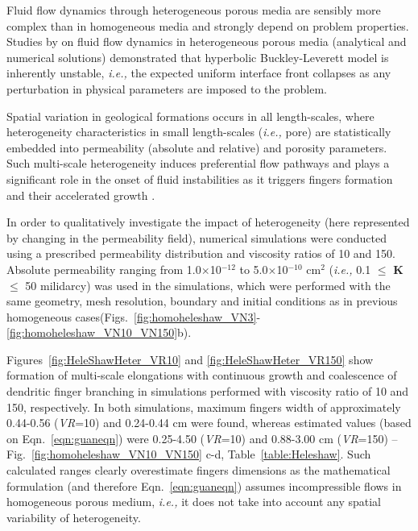 \documentclass[preprint,authoryear,12pt]{elsarticle}
\newcommand{\ie}{{\it i.e., }}
\begin{document}
\medskip
Fluid flow dynamics through heterogeneous porous media are sensibly more complex than in homogeneous media and strongly depend on problem properties. Studies by \citet{langtangen_1992} on fluid flow dynamics in heterogeneous porous media (analytical and numerical solutions) demonstrated that hyperbolic Buckley-Leverett model is inherently unstable, \ie the expected uniform interface front collapses as any perturbation in physical parameters are imposed to the problem. 

Spatial variation in geological formations occurs in all length-scales, where heterogeneity characteristics in small length-scales (\ie pore) are statistically embedded into permeability (absolute and relative) and porosity parameters. Such multi-scale heterogeneity induces preferential flow pathways and plays a significant role in the onset of fluid instabilities as it triggers fingers formation and their accelerated growth \citep[see][]{ewing_1989,tchelepi_1994}.

\medskip
In order to qualitatively investigate the impact of heterogeneity (here represented by changing in the permeability field), numerical simulations were conducted using a prescribed permeability distribution and viscosity ratios of 10 and 150. Absolute permeability ranging from 1.0$\times$10$^{-12}$ to 5.0$\times$10$^{-10}$ cm$^{2}$ (\ie 0.1 $\le$ {\bf K} $\le$ 50 milidarcy) was used in the simulations, which were performed with the same geometry,  mesh resolution, boundary and initial conditions as in previous homogeneous cases(Figs.~\ref{fig:homoheleshaw_VN3}-\ref{fig:homoheleshaw_VN10_VN150}b). 

\medskip
Figures~\ref{fig:HeleShawHeter_VR10} and \ref{fig:HeleShawHeter_VR150} show formation of multi-scale elongations with continuous growth and coalescence of dendritic finger branching in simulations performed with viscosity ratio of 10 and 150, respectively. In both simulations, maximum fingers width of approximately 0.44-0.56 ({\it VR}=10) and 0.24-0.44 cm were found, whereas estimated values (based on Eqn.~\ref{eqn:guaneqn}) were 0.25-4.50 ({\it VR}=10) and 0.88-3.00 cm ({\it VR}=150) -- Fig.~\ref{fig:homoheleshaw_VN10_VN150} c-d, Table~\ref{table:Heleshaw}. Such calculated ranges \citep[\ie theoretical values based on analytic solutions due to][]{mclean_1981} clearly overestimate fingers dimensions as the mathematical formulation (and therefore Eqn.~\ref{eqn:guaneqn}) assumes incompressible flows in homogeneous porous medium, \ie it does not take into account any spatial variability of heterogeneity.       
     
\end{document}
